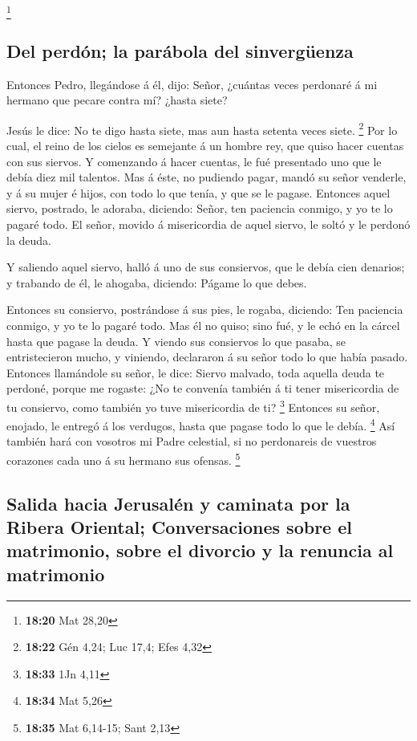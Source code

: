 \footnote{\textbf{18:20} Mat 28,20}

\hypertarget{del-perduxf3n-la-paruxe1bola-del-sinverguxfcenza}{%
\subsection{Del perdón; la parábola del
sinvergüenza}\label{del-perduxf3n-la-paruxe1bola-del-sinverguxfcenza}}

 Entonces Pedro, llegándose á él, dijo: Señor, ¿cuántas
veces perdonaré á mi hermano que pecare contra mí? ¿hasta siete?

 Jesús le dice: No te digo hasta siete, mas aun hasta
setenta veces siete. \footnote{\textbf{18:22} Gén 4,24; Luc 17,4; Efes
  4,32}  Por lo cual, el reino de los cielos es semejante á
un hombre rey, que quiso hacer cuentas con sus siervos.  Y
comenzando á hacer cuentas, le fué presentado uno que le debía diez mil
talentos.  Mas á éste, no pudiendo pagar, mandó su señor
venderle, y á su mujer é hijos, con todo lo que tenía, y que se le
pagase.  Entonces aquel siervo, postrado, le adoraba,
diciendo: Señor, ten paciencia conmigo, y yo te lo pagaré todo.
 El señor, movido á misericordia de aquel siervo, le soltó
y le perdonó la deuda.

 Y saliendo aquel siervo, halló á uno de sus consiervos,
que le debía cien denarios; y trabando de él, le ahogaba, diciendo:
Págame lo que debes.

 Entonces su consiervo, postrándose á sus pies, le rogaba,
diciendo: Ten paciencia conmigo, y yo te lo pagaré todo. 
Mas él no quiso; sino fué, y le echó en la cárcel hasta que pagase la
deuda.  Y viendo sus consiervos lo que pasaba, se
entristecieron mucho, y viniendo, declararon á su señor todo lo que
había pasado.  Entonces llamándole su señor, le dice:
Siervo malvado, toda aquella deuda te perdoné, porque me rogaste:
 ¿No te convenía también á ti tener misericordia de tu
consiervo, como también yo tuve misericordia de ti? \footnote{\textbf{18:33}
  1Jn 4,11}  Entonces su señor, enojado, le entregó á los
verdugos, hasta que pagase todo lo que le debía. \footnote{\textbf{18:34}
  Mat 5,26}  Así también hará con vosotros mi Padre
celestial, si no perdonareis de vuestros corazones cada uno á su hermano
sus ofensas. \footnote{\textbf{18:35} Mat 6,14-15; Sant 2,13}

\hypertarget{salida-hacia-jerusaluxe9n-y-caminata-por-la-ribera-oriental-conversaciones-sobre-el-matrimonio-sobre-el-divorcio-y-la-renuncia-al-matrimonio}{%
\subsection{Salida hacia Jerusalén y caminata por la Ribera Oriental;
Conversaciones sobre el matrimonio, sobre el divorcio y la renuncia al
matrimonio}\label{salida-hacia-jerusaluxe9n-y-caminata-por-la-ribera-oriental-conversaciones-sobre-el-matrimonio-sobre-el-divorcio-y-la-renuncia-al-matrimonio}}

